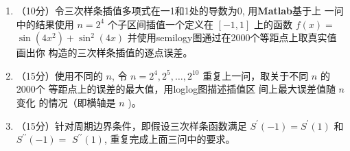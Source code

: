 \documentclass[12pt,a4paper,UTF8]{ctexart}
\begin{document}
\begin{enumerate}
\begin{enumerate}
$$\begin{array}{c}
M_{n}
\end{array}\right]=\left[\begin{array}{c}
d_{0} \\
d_{1} \\
d_{2} \\
\vdots \\
d_{n-1} \\
d_{n}
\end{array}\right]
$$
\item（10分）令三次样条插值多项式在一1和1处的导数为0, 用\textbf{Matlab}基于上
    一问中的结果使用 $n=2^{4}$ 个子区间插值一个定义在 $[-1,1]$ 上的函数 $f(x)=$ $\sin \left(4 x^{2}\right)+\sin ^{2}(4 x)$ 并使用semilogy图通过在2000个等距点上取真实值画出你 构造的三次样条插值的逐点误差。
    \item（15分）使用不同的 $n$, 令 $n=2^{4}, 2^{5}, \ldots, 2^{10}$ 重复上一问，取关于不同 $n$ 的2000个
    等距点上的误差的最大值，用loglog图描述插值区
    间上最大误差值随 $n$ 变化
    的情况（即横轴是 $n$ )。
    \item（15分）针对周期边界条件，即假设三次样条函数满足 $S^{\prime}(-1)=S^{\prime}(1)$ 和 $S^{\prime \prime}(-1)=$ $S^{\prime \prime}(1)$, 重复完成上面三问中的要求。
         

\end{enumerate}

\end{enumerate}
\end{document}

